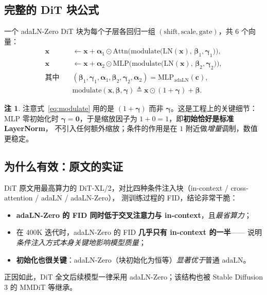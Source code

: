 \documentclass[11pt]{ctexart}
\newcommand{\LN}{\mathrm{LN}}
\newcommand{\modu}{\mathrm{modulate}}
\newcommand{\cc}{\mathbf{c}}
\newcommand{\xx}{\mathbf{x}}
\theoremstyle{definition}
\newtheorem{remark}{注}[section]
\begin{document}
\subsection{完整的 DiT 块公式}
一个 adaLN-Zero DiT 块为每个子层各回归一组 $(\text{shift},\text{scale},\text{gate})$，共 6 个向量：
\begin{align}
\xx &\leftarrow \xx + \bm\alpha_1\odot \mathrm{Attn}\Big(\modu\big(\LN(\xx),\,\bm\beta_1,\bm\gamma_1\big)\Big),\\
\xx &\leftarrow \xx + \bm\alpha_2\odot \mathrm{MLP}\Big(\modu\big(\LN(\xx),\,\bm\beta_2,\bm\gamma_2\big)\Big),\\
\text{其中}\quad
&(\bm\beta_1,\bm\gamma_1,\bm\alpha_1,\bm\beta_2,\bm\gamma_2,\bm\alpha_2)
= \mathrm{MLP}_{\text{adaLN}}(\cc),\\
&\modu(\xx,\bm\beta,\bm\gamma) \triangleq \xx\odot(1+\bm\gamma) + \bm\beta. \label{eq:modulate}
\end{align}

\begin{remark}
注意式~\eqref{eq:modulate} 用的是 $(1+\bm\gamma)$ 而非 $\bm\gamma$。这是工程上的关键细节：
MLP 零初始化时 $\bm\gamma=\bm 0$，于是缩放因子为 $1+0=1$，即\textbf{初始恰好是标准 LayerNorm}，
不引入任何额外缩放；条件的作用是在 $1$ 附近做\emph{增量}调制，数值更稳定。
\end{remark}

\subsection{为什么有效：原文的实证}
DiT 原文用最高算力的 DiT-XL/2，对比四种条件注入块（in-context / cross-attention / adaLN / adaLN-Zero），
测训练过程的 FID，结论非常干脆：
\begin{itemize}
  \item \textbf{adaLN-Zero 的 FID 同时低于交叉注意力与 in-context}，且\emph{最省算力}；
  \item 在 400K 迭代时，adaLN-Zero 的 FID \textbf{几乎只有 in-context 的一半}——
        说明\emph{条件注入方式本身关键地影响模型质量}；
  \item \textbf{初始化也很关键}：adaLN-Zero（块初始化为恒等）\emph{显著优于}普通 adaLN。
\end{itemize}
正因如此，DiT 全文后续模型一律采用 adaLN-Zero；该结构也被 Stable Diffusion 3 的 MMDiT 等继承。
\end{document}
